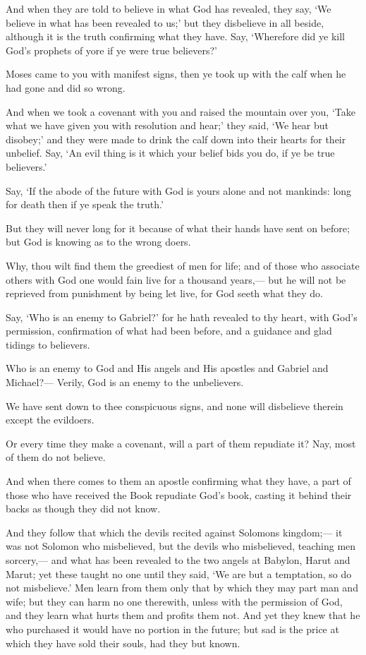 \documentclass[fontsize=14pt, letterpaper, notitlepage, openany, DIV=12]{scrbook} %
\begin{document}
\noindent[2:91]
And when they are told to believe in what God has revealed, they say, `We believe in
what has been revealed to us;' but they disbelieve in all beside, although it is the truth confirming
what they have. Say, `Wherefore did ye kill God's prophets of yore if ye were true believers?'

\noindent[2:92]
Moses came to you with manifest signs, then ye took up with the calf when he had gone
and did so wrong.

\noindent[2:93]
And when we took a covenant with you and raised the mountain over you, `Take what we
have given you with resolution and hear;' they said, `We hear but disobey;' and they were made
to drink the calf down into their hearts for their unbelief. Say, `An evil thing is it which your
belief bids you do, if ye be true believers.'

\noindent[2:94]
Say, `If the abode of the future with God is yours alone and not mankinds: long for death
then if ye speak the truth.'

\noindent[2:95]
But they will never long for it because of what their hands have sent on before; but God
is knowing as to the wrong doers.

\noindent[2:96]
Why, thou wilt find them the greediest of men for life; and of those who associate others
with God one would fain live for a thousand years,--- but he will not be reprieved from
punishment by being let live, for God seeth what they do.

\noindent[2:97]
Say, `Who is an enemy to Gabriel?' for he hath revealed to thy heart, with God's
permission, confirmation of what had been before, and a guidance and glad tidings to believers.

\noindent[2:98]
Who is an enemy to God and His angels and His apostles and Gabriel and Michael?---
Verily, God is an enemy to the unbelievers.

\noindent[2:99]
We have sent down to thee conspicuous signs, and none will disbelieve therein except the
evildoers.

\noindent[2:100]
Or every time they make a covenant, will a part of them repudiate it? Nay, most of them
do not believe.

\noindent[2:101]
And when there comes to them an apostle confirming what they have, a part of those who
have received the Book repudiate God's book, casting it behind their backs as though they did
not know.

\noindent[2:102]
And they follow that which the devils recited against Solomons kingdom;--- it was not
Solomon who misbelieved, but the devils who misbelieved, teaching men sorcery,--- and what
has been revealed to the two angels at Babylon, Harut and Marut; yet these taught no one until
they said, `We are but a temptation, so do not misbelieve.' Men learn from them only that by
which they may part man and wife; but they can harm no one therewith, unless with the
permission of God, and they learn what hurts them and profits them not. And yet they knew that
he who purchased it would have no portion in the future; but sad is the price at which they have
sold their souls, had they but known.
\end{document}

